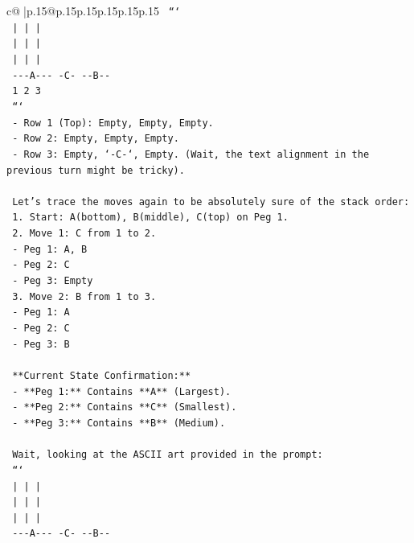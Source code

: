 \documentclass{article}
\begin{document}
{\begin{supertabular}{c@{$\;$}|p{.15\linewidth}@{}p{.15\linewidth}p{.15\linewidth}p{.15\linewidth}p{.15\linewidth}p{.15\linewidth}}
{{{\texttt{  ```} \\
\texttt{     |       |       |   } \\
\texttt{     |       |       |   } \\
\texttt{     |       |       |   } \\
\texttt{  {-}{-}{-}A{-}{-}{-}   {-}C{-}    {-}{-}B{-}{-} } \\
\texttt{     1       2       3  } \\
\texttt{  ```} \\
\texttt{  {-} Row 1 (Top): Empty, Empty, Empty.} \\
\texttt{  {-} Row 2: Empty, Empty, Empty.} \\
\texttt{  {-} Row 3: Empty, `{-}C{-}`, Empty. (Wait, the text alignment in the previous turn might be tricky).} \\
\\ 
\texttt{  Let's trace the moves again to be absolutely sure of the stack order:} \\
\texttt{  1. Start: A(bottom), B(middle), C(top) on Peg 1.} \\
\texttt{  2. Move 1: C from 1 to 2.} \\
\texttt{     {-} Peg 1: A, B} \\
\texttt{     {-} Peg 2: C} \\
\texttt{     {-} Peg 3: Empty} \\
\texttt{  3. Move 2: B from 1 to 3.} \\
\texttt{     {-} Peg 1: A} \\
\texttt{     {-} Peg 2: C} \\
\texttt{     {-} Peg 3: B} \\
\\ 
\texttt{  **Current State Confirmation:**} \\
\texttt{  {-} **Peg 1:** Contains **A** (Largest).} \\
\texttt{  {-} **Peg 2:** Contains **C** (Smallest).} \\
\texttt{  {-} **Peg 3:** Contains **B** (Medium).} \\
\\ 
\texttt{  Wait, looking at the ASCII art provided in the prompt:} \\
\texttt{  ```} \\
\texttt{     |       |       |   } \\
\texttt{     |       |       |   } \\
\texttt{     |       |       |   } \\
\texttt{  {-}{-}{-}A{-}{-}{-}   {-}C{-}    {-}{-}B{-}{-} } \\
}}}
\end{supertabular}}
\end{document}
